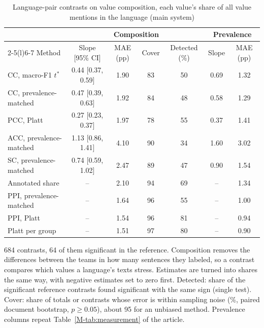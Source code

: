 \begin{table}[t]
\caption{Language-pair contrasts on value composition, each value's share of all value mentions in the language (main system)}
\label{tab:composition}
\centering
\scriptsize
\setlength{\tabcolsep}{3pt}
\begin{tabular*}{\textwidth}{@{\extracolsep{\fill}}lcccccc@{}}
\toprule
 & \multicolumn{4}{c}{Composition} & \multicolumn{2}{c}{Prevalence} \\
\cmidrule(lr){2-5}\cmidrule(l){6-7}
Method & Slope [95\% CI] & MAE (pp) & Cover & Detected (\%) & Slope & MAE (pp) \\
\midrule
CC, macro-F1 $t^*$ & 0.44 [0.37, 0.59] & 1.90 & 83 & 50 & 0.69 & 1.32 \\
CC, prevalence-matched & 0.47 [0.39, 0.63] & 1.92 & 84 & 48 & 0.58 & 1.29 \\
PCC, Platt & 0.27 [0.23, 0.37] & 1.97 & 78 & 55 & 0.37 & 1.41 \\
ACC, prevalence-matched & 1.13 [0.86, 1.41] & 4.10 & 90 & 34 & 1.60 & 3.02 \\
SC, prevalence-matched & 0.74 [0.59, 1.02] & 2.47 & 89 & 47 & 0.90 & 1.54 \\
Annotated share & -- & 2.10 & 94 & 69 & -- & 1.34 \\
PPI, prevalence-matched & -- & 1.64 & 96 & 55 & -- & 1.00 \\
PPI, Platt & -- & 1.54 & 96 & 81 & -- & 0.94 \\
Platt per group & -- & 1.51 & 97 & 80 & -- & 0.90 \\
\bottomrule
\end{tabular*}
\par\vspace{2pt}
\begin{minipage}{\textwidth}\scriptsize 684 contrasts, 64 of them significant in the reference. Composition removes the differences between the teams in how many sentences they labeled, so a contrast compares which values a language's texts stress. Estimates are turned into shares the same way, with negative estimates set to zero first. Detected: share of the significant reference contrasts found significant with the same sign (single test). Cover: share of totals or contrasts whose error is within sampling noise (\%, paired document bootstrap, $p \geq 0.05$), about 95 for an unbiased method. Prevalence columns repeat Table~\ref{M-tab:measurement} of the article.\end{minipage}
\end{table}
